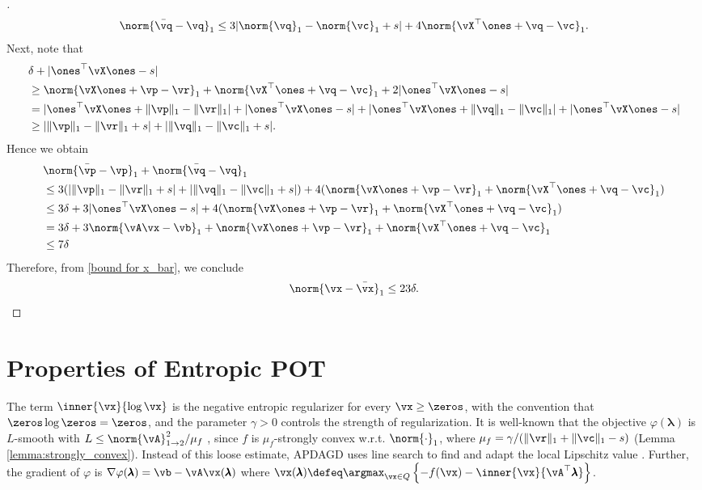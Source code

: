 \begin{proof}[\unskip \nopunct]
\begin{align*}
    \norm{\bar{\vq} - \vq}_1 \leq 3 |\norm{\vq}_1 - \norm{\vc}_1 + s| + 4 \norm{\vX^\top \ones + \vq - \vc}_1.
\end{align*}
Next, note that
\begin{align*}
    &\delta + |\ones^\top \vX \ones - s| \\
    &\geq \norm{\vX \ones + \vp - \vr}_1 + \norm{\vX^\top \ones + \vq - \vc}_1 + 2 |\ones^\top \vX \ones - s| \\
    &= |\ones^\top \vX \ones + \|\vp\|_1 - \|\vr\|_1| + |\ones^\top \vX \ones - s| + |\ones^\top \vX \ones + \|\vq\|_1 - \|\vc\|_1| + |\ones^\top \vX \ones - s| \\ 
    &\geq |\|\vp\|_1 - \|\vr\|_1 + s| + |\|\vq\|_1 - \|\vc\|_1 + s|.
\end{align*}
Hence we obtain
\begin{align*}
    &\norm{\bar{\vp} - \vp}_1 + \norm{\bar{\vq} - \vq}_1\\
    &\leq 3 (|\|\vp\|_1 - \|\vr\|_1 + s| + |\|\vq\|_1 - \|\vc\|_1 + s|) + 4 (\norm{\vX \ones + \vp - \vr}_1 +\norm{\vX^\top \ones + \vq - \vc}_1) \\
    &\leq 3 \delta + 3|\ones^\top \vX \ones - s| +  4 (\norm{\vX \ones + \vp - \vr}_1 +\norm{\vX^\top \ones + \vq - \vc}_1) \\
    &= 3 \delta + 3 \norm{\vA \vx -\vb}_1 + \norm{\vX \ones + \vp - \vr}_1 +\norm{\vX^\top \ones + \vq - \vc}_1 \\
    &\leq 7 \delta
\end{align*}
Therefore, from \eqref{bound for x_bar}, we conclude 
\begin{align*}
    \norm{\vx - \bar{\vx}}_1 \leq 23 \delta.
\end{align*}
\end{proof}
\section{Properties of Entropic POT}
The term $\inner{\vx}{\log \vx}$ is  the negative entropic regularizer for every $\vx \geq \zeros$, with the convention that $\zeros \log \zeros = \zeros$, and the parameter $\gamma > 0$ controls the strength of regularization. It is well-known that the objective $\varphi(\pmb{\lambda})$ is $L$-smooth with $L \leq \norm{\vA}^2_{1 \rightarrow 2} / \mu_f$ \citep{nesterov2005smooth}, since $f$ is $\mu_f$-strongly convex w.r.t. $\norm{\cdot}_1$, where $\mu_f = \gamma / (\| \vr \|_1 + \| \vc \|_1 - s)$ (Lemma \ref{lemma:strongly_convex}). Instead of this loose estimate, APDAGD uses line search to find and adapt the local Lipschitz value \citep{Dvurechensky-2018-Computational}. Further, the gradient of $\varphi$ is $\nabla\varphi(\pmb{\lambda}) = \vb - \vA \vx(\pmb{\lambda})$ where $\vx(\pmb{\lambda}) \defeq \argmax_{\vx \in Q} \left\{ - f(\vx) - \inner{\vx}{\vA^\top \pmb{\lambda}} \right\}$. 
